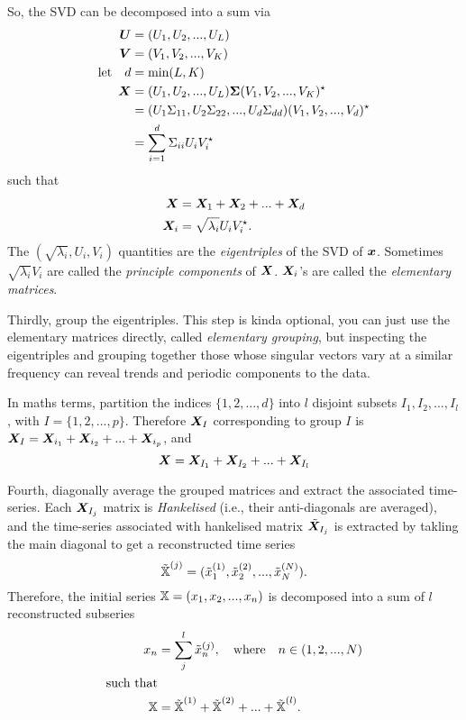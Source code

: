 So, the SVD can be decomposed into a sum via
\begin{align*}
	\bm{U} &= (U_1, U_2, ..., U_L) \\
	\bm{V} &= (V_1, V_2, ..., V_K) \\
	\textrm{let} \quad d &= \textrm{min}(L,K) \\
	\bm{X} &= (U_1, U_2, ..., U_L) \bm{\Sigma} (V_1, V_2, ..., V_K)^\star \\
			&= (U_1 \Sigma_{11}, U_2 \Sigma_{22}, ..., U_d \Sigma_{dd}) (V_1, V_2, ..., V_d)^\star \\
			&= \sum_{i=1}^{d} \Sigma_{ii} U_i V_i^\star
\end{align*}
such that
\begin{align*}
	\bm{X} &= \bm{X}_1 + \bm{X}_2 + ... + \bm{X}_d \\
	\bm{X}_i &= \sqrt{\lambda_i}U_iV_i^\star.
\end{align*}
The $(\sqrt{\lambda_i}, U_i, V_i)$ quantities are the \emph{eigentriples} of the SVD of $\bm{x}$. Sometimes $\sqrt{\lambda_i}V_i$ are called the \emph{principle components} of $\bm{X}$. $\bm{X}_i$'s are called the \emph{elementary matrices}.

Thirdly, group the eigentriples. This step is kinda optional, you can just use the elementary matrices directly, called \emph{elementary grouping}, but inspecting the eigentriples and grouping together those whose singular vectors vary at a similar frequency can reveal trends and periodic components to the data. 

In maths terms, partition the indices $\lbrace 1, 2, ..., d\rbrace$ into $l$ disjoint subsets $I_1, I_2, ..., I_l$, with $I = \lbrace 1,2,...,p \rbrace$. Therefore $\bm{X}_I$ corresponding to group $I$ is $\bm{X}_I = \bm{X}_{i_1} + \bm{X}_{i_2} + ... + \bm{X}_{i_p}$, and
\[
	\bm{X} = \bm{X}_{I_1} + \bm{X}_{I_2} + ... + \bm{X}_{I_l}
\]

Fourth, diagonally average the grouped matrices and extract the associated time-series. Each $\bm{X}_{I_j}$ matrix is \emph{Hankelised} (i.e., their anti-diagonals are averaged), and the time-series associated with hankelised matrix $\tilde{\bm{X}}_{I_j}$ is extracted by takling the main diagonal to get a reconstructed time series
\[
	\tilde{\bm{\mathbb{X}}}^{(j)} = (\tilde{x}_1^{(1)}, \tilde{x}_2^{(2)}, ...,\tilde{x}_N^{(N)}). 
\]
Therefore, the initial series $\bm{\mathbb{X}} = (x_1, x_2, ..., x_n)$ is decomposed into a sum of $l$ reconstructed subseries
\begin{align*}
	x_n &= \sum_j^{l} \tilde{x}_n^{(j)}, \quad \textrm{where} \quad n \in (1,2,...,N) \\
	\textrm{such that}& \\
	\bm{\mathbb{X}} &= \tilde{\bm{\mathbb{X}}}^{(1)} + \tilde{\bm{\mathbb{X}}}^{(2)} + ... + \tilde{\bm{\mathbb{X}}}^{(l)}.
\end{align*}

